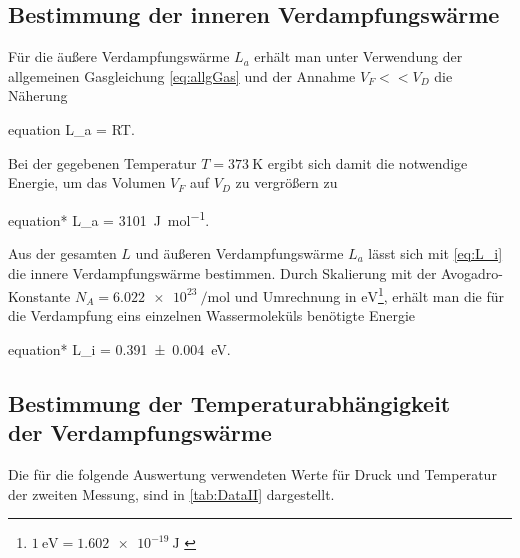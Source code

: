 	\subsection{Bestimmung der inneren Verdampfungswärme}
	\label{sec:innereVerdampfungswärme}
	Für die äußere Verdampfungswärme $L_{a}$ erhält man unter Verwendung der allgemeinen
	Gasgleichung \eqref{eq:allgGas} und der Annahme $V_{F} << V_{D} $ die Näherung
	\begin{empheq}{equation}
	 	\label{eq:L_a}
	 	L_{a} = RT.
	\end{empheq}
	Bei der gegebenen Temperatur $T = \SI{373}{\kelvin}$ ergibt sich damit die notwendige 
	Energie, um das Volumen $V_{F}$ auf $V_{D}$ zu vergrößern zu
	\begin{empheq}{equation*}
		 	L_{a} =  \SI{3101}{\joule\per\mole}\;.
    \end{empheq}  
	Aus der gesamten $L$ und  äußeren Verdampfungswärme $L_{a}$ lässt sich mit \eqref{eq:L_i}
	die innere Verdampfungswärme bestimmen. Durch Skalierung mit der Avogadro-Konstante 
	$N_{A} = \SI{6.022e23}{\per\mole}$ \cite{SciPy} und Umrechnung in $\si{\eV}$\footnote{$\SI{1}{\eV} = \SI{1.602e-19}{\joule}$ \cite{SciPy}},
	erhält man die für die Verdampfung eins einzelnen Wassermoleküls benötigte Energie
	\begin{empheq}{equation*}
			 	L_{i} =  \SI{0.391(4)}{\eV}\;.
	\end{empheq} 
	
	
\subsection{Bestimmung der Temperaturabhängigkeit\\ der Verdampfungswärme}
\label{sec:TAbhängig}
	Die für die folgende Auswertung verwendeten Werte für Druck und Temperatur der zweiten Messung, sind in
	\autoref{tab:DataII} dargestellt. 
	
